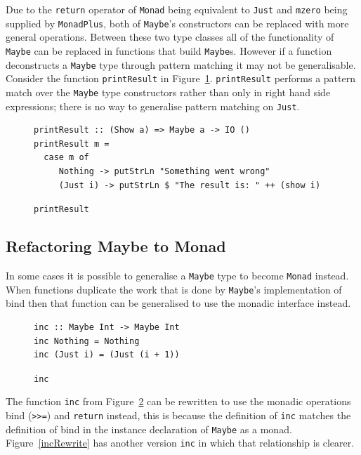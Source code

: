 Due to the \texttt{return} operator of \texttt{Monad} being equivalent to \texttt{Just} and \texttt{mzero} being supplied by \texttt{MonadPlus}, both of \texttt{Maybe}'s constructors can be replaced with more general operations. Between these two type classes all of the functionality of \texttt{Maybe} can be replaced in functions that build \texttt{Maybe}s. However if a function deconstructs a \texttt{Maybe} type through pattern matching it may not be generalisable. Consider the function \texttt{printResult} in Figure~\ref{printRes}. \texttt{printResult} performs a pattern match over the \texttt{Maybe} type constructors rather than only in right hand side expressions; there is no way to generalise pattern matching on \texttt{Just}.

\begin{figure}[t]
\begin{lstlisting}
printResult :: (Show a) => Maybe a -> IO ()
printResult m =
  case m of
     Nothing -> putStrLn "Something went wrong"
     (Just i) -> putStrLn $ "The result is: " ++ (show i)
\end{lstlisting}
\caption{\texttt{printResult}}
\label{printRes}
\end{figure}

\subsection{Refactoring Maybe to Monad}\label{genMonad}

In some cases it is possible to generalise a \texttt{Maybe} type to become \texttt{Monad} instead. When functions duplicate the work that is done by \texttt{Maybe}'s implementation of bind then that function can be generalised to use the monadic interface instead.

\begin{figure}[t]
\begin{lstlisting}
inc :: Maybe Int -> Maybe Int
inc Nothing = Nothing
inc (Just i) = (Just (i + 1))
\end{lstlisting}
\caption{\texttt{inc}}
\label{mmp1}
\end{figure}

The function \texttt{inc} from Figure~\ref{mmp1} can be rewritten to use the monadic operations bind (\texttt{>>=}) and \texttt{return} instead, this is because the definition of \texttt{inc} matches the definition of bind in the instance declaration of \texttt{Maybe} as a monad. Figure~\ref{incRewrite} has another version \texttt{inc} in which that relationship is clearer.

